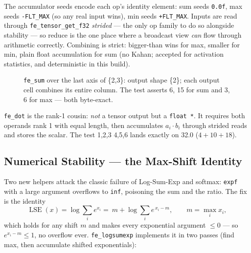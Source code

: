 \documentclass[11pt,a4paper]{article}
\begin{document}
The accumulator seeds encode each op's identity element: sum seeds
\texttt{0.0f}, max seeds \texttt{-FLT\_MAX} (so any real input wins), min seeds
\texttt{+FLT\_MAX}. Inputs are read through \texttt{fe\_tensor\_get\_f32}
\emph{strided} --- the only op family to do so alongside stability --- so
reduce is the one place where a broadcast view \emph{can} flow through
arithmetic correctly. Combining is strict: bigger-than wins for max, smaller
for min, plain float accumulation for sum (no Kahan; accepted for activation
statistics, and deterministic in this build).

\begin{figure}[h]
\centering
{}
\caption{\texttt{fe\_sum} over the last axis of \{2,3\}: output shape \{2\};
each output cell combines its entire column. The test asserts 6, 15 for sum and
3, 6 for max --- both byte-exact.}
\label{fig:reduce}
\end{figure}

\texttt{fe\_dot} is the rank-1 cousin: \emph{not} a tensor output but a
\texttt{float *}. It requires both operands rank 1 with equal length, then
accumulates $a_i \cdot b_i$ through strided reads and stores the scalar. The
test {1,2,3} \textbullet {} {4,5,6} lands exactly on 32.0 ($4+10+18$).

\subsection{Numerical Stability --- the Max-Shift Identity}

Two new helpers attack the classic failure of Log-Sum-Exp and softmax:
\texttt{expf} with a large argument overflows to \texttt{inf}, poisoning the
sum and the ratio. The fix is the identity
\[
\operatorname{LSE}(x)=\log\sum_i e^{x_i}
=\ m+\log\sum_i e^{\,x_i-m},
\qquad m=\max_i x_i,
\]
which holds for any shift $m$ and makes every exponential argument $\le 0$ ---
so $e^{x_i-m}\le 1$, no overflow ever. \texttt{fe\_logsumexp} implements it in
two passes (find max, then accumulate shifted exponentials):
\end{document}
